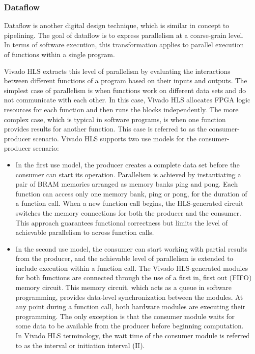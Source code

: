 \subsubsection{Dataflow}
Dataflow is another digital design technique, which is similar in concept to pipelining. The
goal of dataflow is to express parallelism at a coarse-grain level. In terms of software
execution, this transformation applies to parallel execution of functions within a single
program. 

\par Vivado HLS extracts this level of parallelism by evaluating the interactions between different
functions of a program based on their inputs and outputs. The simplest case of parallelism
is when functions work on different data sets and do not communicate with each other. In
this case, Vivado HLS allocates FPGA logic resources for each function and then runs the blocks independently. The more complex case, which is typical in software programs, is when one function provides results for another function. This case is referred to as the consumer-producer scenario. Vivado HLS supports two use models for the consumer-producer scenario: 

\begin{itemize}
  \item In the first use
  model, the producer creates a complete data set before the consumer can start its
  operation. Parallelism is achieved by instantiating a pair of BRAM memories arranged as
  memory banks ping and pong. Each function can access only one memory bank, ping or
  pong, for the duration of a function call. When a new function call begins, the
  HLS-generated circuit switches the memory connections for both the producer and the
  consumer. This approach guarantees functional correctness but limits the level of
  achievable parallelism to across function calls.
  \item In the second use model, the consumer can start working with partial results from the
  producer, and the achievable level of parallelism is extended to include execution within a
  function call. The Vivado HLS-generated modules for both functions are connected through
  the use of a first in, first out (FIFO) memory circuit. This memory circuit, which acts as a
  queue in software programming, provides data-level synchronization between the modules.
  At any point during a function call, both hardware modules are executing their
  programming. The only exception is that the consumer module waits for some data to be
  available from the producer before beginning computation. In Vivado HLS terminology, the
  wait time of the consumer module is referred to as the interval or initiation interval (II).
\end{itemize}
\clearpage


